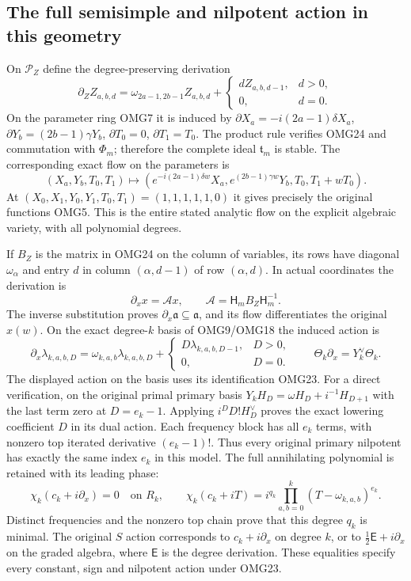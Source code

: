 \documentclass[11pt,a4paper]{article}
\begin{document}
\subsection{The full semisimple and nilpotent action in this geometry}
On $\mathscr P_Z$ define the degree-preserving derivation
\[
 \partial_Z Z_{a,b,d}=\omega_{2a-1,2b-1}Z_{a,b,d}
                   +\begin{cases}d Z_{a,b,d-1},&d>0,\\0,&d=0.
                     \end{cases}
 \tag{OMG24}
\]
On the parameter ring OMG7 it is induced by
$\partial X_a=-i(2a-1)\delta X_a$,
$\partial Y_b=(2b-1)\gamma Y_b$,
$\partial T_0=0$, $\partial T_1=T_0$.
The product rule verifies OMG24 and commutation with $\Phi_m$;
therefore the complete ideal $\mathfrak t_m$ is stable.
The corresponding exact flow on the parameters is
\[
 (X_a,Y_b,T_0,T_1)\longmapsto
 (e^{-i(2a-1)\delta w}X_a,e^{(2b-1)\gamma w}Y_b,T_0,T_1+wT_0).
\]
At $(X_0,X_1,Y_0,Y_1,T_0,T_1)=(1,1,1,1,1,0)$ it gives precisely
the original functions OMG5. This is the entire stated analytic
flow on the explicit algebraic variety, with all polynomial degrees.

If $B_Z$ is the matrix in OMG24 on the column of variables, its
rows have diagonal $\omega_\alpha$ and entry $d$ in column
$(\alpha,d-1)$ of row $(\alpha,d)$. In actual coordinates the
derivation is
\[
 \partial_x x=\mathcal A x,\qquad
 \mathcal A=\mathsf H_mB_Z\mathsf H_m^{-1}.
 \tag{OMG25}
\]
The inverse substitution proves $\partial_x\mathfrak a\subseteq
\mathfrak a$, and its flow differentiates the original $x(w)$.
On the exact degree-$k$ basis of OMG9/OMG18 the induced action is
\[
 \partial_x\lambda_{k,a,b,D}
   =\omega_{k,a,b}\lambda_{k,a,b,D}
             +\begin{cases}D\lambda_{k,a,b,D-1},&D>0,\\0,&D=0.
              \end{cases}\qquad
 \Theta_k\partial_x=Y_k^\vee\Theta_k.
 \tag{OMG26}
\]
The displayed action on the basis uses its identification OMG23.
For a direct verification, on the original primal primary basis
$Y_kH_D=\omega H_D+i^{-1}H_{D+1}$ with the last term zero at
$D=e_k-1$. Applying $i^DD!H_D^\vee$ proves the exact lowering
coefficient $D$ in its dual action. Each frequency block has all
$e_k$ terms, with nonzero top iterated derivative
$(e_k-1)!$. Thus every original primary nilpotent has exactly the
same index $e_k$ in this model. The full annihilating polynomial
is retained with its leading phase:
\[
 \chi_k(c_k+i\partial_x)=0\quad\text{on }R_k,\qquad
 \chi_k(c_k+iT)=i^{q_k}\prod_{a,b=0}^k(T-\omega_{k,a,b})^{e_k}.
 \tag{OMG27}
\]
Distinct frequencies and the nonzero top chain prove that this
degree $q_k$ is minimal. The original $S$ action corresponds to
$c_k+i\partial_x$ on degree $k$, or to
$\tfrac12\mathsf E+i\partial_x$ on the graded algebra, where
$\mathsf E$ is the degree derivation. These equalities specify
every constant, sign and nilpotent action under OMG23.
\end{document}
